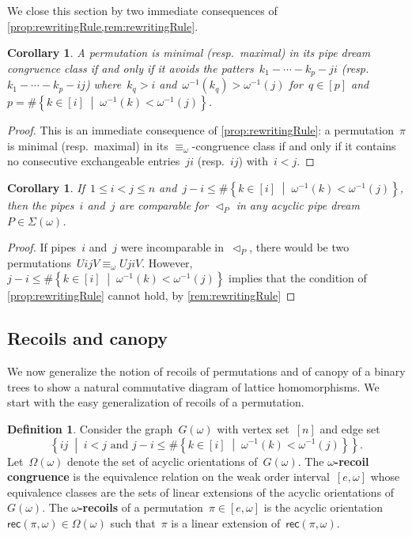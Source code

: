 \documentclass[reqno]{amsart}
\newtheorem{corollary}[theorem]{Corollary}
\theoremstyle{definition}
\newtheorem{definition}[theorem]{Definition}
\newcommand{\set}[2]{\left\{ #1 \;\middle|\; #2 \right\}} %
\newcommand{\defn}[1]{\textbf{\textsf{\color{PineGreen} #1}}} %
\newcommand{\acyclicPipeDreams}{\Sigma} %
\newcommand{\acyclicOrientations}{\Omega} %
\newcommand{\recoils}[2]{\mathsf{rec}(#1,#2)} %
\newcommand{\less}{\vartriangleleft} %
\newcommand{\contactLess}[1]{\less_{#1}} %
\begin{document}
We close this section by two immediate consequences of \cref{prop:rewritingRule,rem:rewritingRule}.

\begin{corollary}
\label{coro:patternAvoiding}
A permutation is minimal (resp.~maximal) in its pipe dream congruence class if and only if it avoids the patters~$k_1 - \cdots - k_p - ji$ (resp.~$k_1 - \cdots - k_p - ij$) where~$k_q > i$ and~$\omega^{-1}(k_q) > \omega^{-1}(j)$ for~$q \in [p]$ and~$p = \# \set{k \in [i]}{\omega^{-1}(k) < \omega^{-1}(j)}$.
\end{corollary}

\begin{proof}
This is an immediate consequence of \cref{prop:rewritingRule}: a permutation~$\pi$ is minimal (resp.~maximal) in its $\equiv_\omega$-congruence class if and only if it contains no consecutive exchangeable entries~$ji$ (resp.~$ij$) with~$i < j$.
\end{proof}

\begin{corollary}
\label{coro:canopy}
If~$1 \le i < j \le n$ and~$j-i \le \#\set{k \in [i]}{\omega^{-1}(k) < \omega^{-1}(j)}$, then the pipes~$i$ and~$j$ are comparable for $\contactLess{P}$ in any acyclic pipe dream~$P \in \acyclicPipeDreams(\omega)$.
\end{corollary}

\begin{proof}
If pipes~$i$ and~$j$ were incomparable in~$\contactLess{P}$, there would be two permutations~$UijV \equiv_\omega UjiV$.
However, $j-i \le \#\set{k \in [i]}{\omega^{-1}(k) < \omega^{-1}(j)}$ implies that the condition of \cref{prop:rewritingRule} cannot hold, by \cref{rem:rewritingRule}
\end{proof}



\subsection{Recoils and canopy}
\label{subsec:canopy}

We now generalize the notion of recoils of permutations and of canopy of a binary trees to show a natural commutative diagram of lattice homomorphisms.
We start with the easy generalization of recoils of a permutation.

\begin{definition}
\label{def:recoils}
Consider the graph~$G(\omega)$ with vertex set~$[n]$ and edge set
\[
\set{ij}{i < j \text{ and } j-i \le \#\set{k \in [i]}{\omega^{-1}(k) < \omega^{-1}(j)}}.
\]
Let~$\acyclicOrientations(\omega)$ denote the set of acyclic orientations of~$G(\omega)$.
The \defn{$\omega$-recoil congruence} is the equivalence relation on the weak order interval~$[e, \omega]$ whose equivalence classes are the sets of linear extensions of the acyclic orientations of~$G(\omega)$.
The \defn{$\omega$-recoils} of a permutation~$\pi \in [e,\omega]$ is the acyclic orientation~${\recoils{\pi}{\omega} \in \acyclicOrientations(\omega)}$ such that~$\pi$ is a linear extension of~$\recoils{\pi}{\omega}$.
\end{definition}
\end{document}
